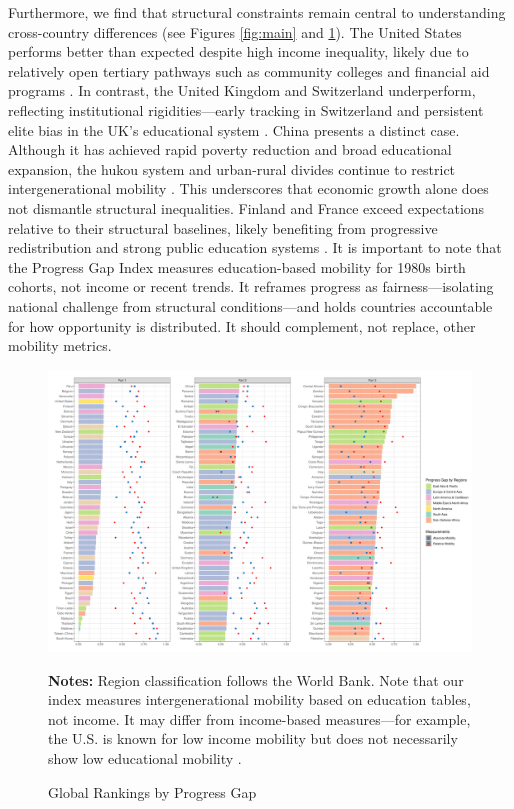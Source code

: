 Furthermore, we find that structural constraints remain central to understanding cross-country differences (see Figures \ref{fig:main} and \ref{fig:rank}). The United States performs better than expected despite high income inequality, likely due to relatively open tertiary pathways such as community colleges and financial aid programs \citep{bailey2011gains}. In contrast, the United Kingdom and Switzerland underperform, reflecting institutional rigidities---early tracking in Switzerland \citep{buchmann2009stratification} and persistent elite bias in the UK's educational system \citep{boliver2013fair}. China presents a distinct case. Although it has achieved rapid poverty reduction and broad educational expansion, the hukou system and urban-rural divides continue to restrict intergenerational mobility \citep{wu2019inequality}. This underscores that economic growth alone does not dismantle structural inequalities. Finland and France exceed expectations relative to their structural baselines, likely benefiting from progressive redistribution and strong public education systems \citep{maurin2008vive, sahlberg2011fourth}. It is important to note that the Progress Gap Index measures education-based mobility for 1980s birth cohorts, not income or recent trends. It reframes progress as fairness---isolating national challenge from structural conditions---and holds countries accountable for how opportunity is distributed. It should complement, not replace, other mobility metrics.

\begin{figure}
	\centering
	\includegraphics[width=0.9\linewidth]{figs/rank.pdf}
	\caption{Global Rankings by Progress Gap}
	\label{fig:rank}
	
	\vspace{0.2cm}
	\begin{minipage}{0.9\linewidth}
		\footnotesize
		\textbf{Notes:} Region classification follows the World Bank. Note that our index measures intergenerational mobility based on education tables, not income. It may differ from income-based measures---for example, the U.S. is known for low income mobility but does not necessarily show low educational mobility \citep{blanden2013cross, narayan2018fair}.
	\end{minipage}
\end{figure}

